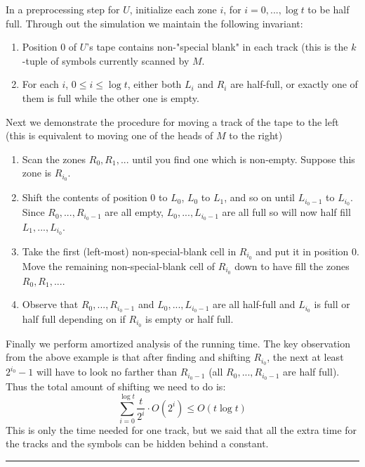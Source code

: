 \documentclass[twoside]{article}
\newenvironment{proof}{{\bf Proof:}}{\hfill\rule{2mm}{2mm}}
\begin{document}
\begin{proof}
In a preprocessing step for $U$, initialize each zone $i$, for $i = 0, ..., \log t$ to be half full. Through out the simulation we maintain the following invariant:
\begin{enumerate}
\item Position $0$ of $U$'s tape contains non-"special blank" in each track (this is the $k$-tuple of symbols currently scanned by $M$. 
\item For each $i$, $0 \leq i \leq \log t$, either both $L_i$ and $R_i$ are half-full, or exactly one of them is full while the other one is empty.
\end{enumerate}  
Next we demonstrate the procedure for moving a track of the tape to the left (this is equivalent to moving one of the heads of $M$ to the right)
\begin{enumerate}
\item Scan the zones $R_0, R_1, ...$ until you find one which is non-empty. Suppose this zone is $R_{i_0}$. 
\item Shift the contents of position $0$ to $L_0$, $L_0$ to $L_1$, and so on until $L_{i_0 - 1}$ to $L_{i_0}$. Since $R_0, ..., R_{i_0 - 1}$ are all empty, $L_0,..., L_{i_0 - 1}$ are all full so will now half fill $L_1, ..., L_{i_0}$. 
\item Take the first (left-most) non-special-blank cell in $R_{i_0}$ and put it in position $0$. Move the remaining non-special-blank cell of $R_{i_0}$ down to have fill the zones $R_0, R_1, ...$.
\item Observe that $R_0, ..., R_{i_0-1}$ and $L_0, ..., L_{i_0-1}$ are all half-full and $L_{i_0}$ is full or half full depending on if $R_{i_0}$ is empty or half full. 
\end{enumerate}

Finally we perform amortized analysis of the running time. The key observation from the above example is that after finding and shifting $R_{i_0}$, the next at least $2^{i_0} - 1$ will have to look no farther than $R_{i_0-1}$ (all $R_0, ..., R_{i_0-1}$ are half full). Thus the total amount of shifting we need to do is:
\[\sum_{i=0}^{\log t} \frac{t}{2^i}\cdot O(2^i) \leq O(t\log t)\]
This is only the time needed for one track, but we said that all the extra time for the tracks and the symbols can be hidden behind a constant.   
\end{proof}
\end{document}
